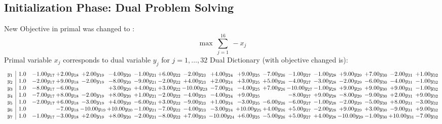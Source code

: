 \documentclass[9pt]{article}
\begin{document}
\subsection{Initialization Phase: Dual Problem Solving}
New Objective in primal was changed to : \[ \max\ \sum_{j=1}^{16}\ - x_j \] 
Primal variable $x_j$ corresponds to dual variable $y_j$ for $j = 1,\ldots,32$
Dual Dictionary (with objective changed is): 
\[\begin{array}{c| c c@{\hskip 2pt} c@{\hskip 2pt} c@{\hskip 2pt} c@{\hskip 2pt} c@{\hskip 2pt} c@{\hskip 2pt} c@{\hskip 2pt} c@{\hskip 2pt} c@{\hskip 2pt} c@{\hskip 2pt} c@{\hskip 2pt} c@{\hskip 2pt} c@{\hskip 2pt} c@{\hskip 2pt} c@{\hskip 2pt} c@{\hskip 2pt} }
 y_{1}   &  1.0 & -1.00 y_{17} & +  2.00 y_{18} & +  2.00 y_{19} & -4.00 y_{20} & -1.00 y_{21} & +  6.00 y_{22} & -2.00 y_{23} & +  4.00 y_{24} & +  9.00 y_{25} & -7.00 y_{26} & -1.00 y_{27} & -1.00 y_{28} & +  9.00 y_{29} & +  7.00 y_{30} & -2.00 y_{31} & +  1.00 y_{32}\\
 y_{2}   &  1.0 & -2.00 y_{17} & +  9.00 y_{18} & -2.00 y_{19} & -8.00 y_{20} & -9.00 y_{21} & -2.00 y_{22} & +  4.00 y_{23} & +  2.00 y_{24} & +  3.00 y_{25} & +  5.00 y_{26} & -4.00 y_{27} & -3.00 y_{28} & -2.00 y_{29} & -6.00 y_{30} & -4.00 y_{31} & -1.00 y_{32}\\
 y_{3}   &  1.0 & -8.00 y_{17} & -6.00 y_{18} &   & +  3.00 y_{20} & +  4.00 y_{21} & +  3.00 y_{22} & -10.00 y_{23} & -7.00 y_{24} & -4.00 y_{25} & +  7.00 y_{26} & -10.00 y_{27} & -1.00 y_{28} & +  9.00 y_{29} & +  9.00 y_{30} & +  9.00 y_{31} & -1.00 y_{32}\\
 y_{4}   &  1.0 & -7.00 y_{17} & +  8.00 y_{18} & -2.00 y_{19} & +  8.00 y_{20} & +  1.00 y_{21} & -2.00 y_{22} & -4.00 y_{23} & -4.00 y_{24} & +  9.00 y_{25} &   & -8.00 y_{27} & +  9.00 y_{28} & -8.00 y_{29} & -9.00 y_{30} & +  2.00 y_{31} & +  9.00 y_{32}\\
 y_{5}   &  1.0 & -2.00 y_{17} & +  6.00 y_{18} & -3.00 y_{19} & +  4.00 y_{20} & -6.00 y_{21} & +  3.00 y_{22} & -9.00 y_{23} & +  1.00 y_{24} & -3.00 y_{25} & -6.00 y_{26} & -6.00 y_{27} & -1.00 y_{28} & -2.00 y_{29} & -5.00 y_{30} & +  8.00 y_{31} & -3.00 y_{32}\\
 y_{6}   &  1.0  &   & -7.00 y_{18} & -10.00 y_{19} & + 10.00 y_{20} & -1.00 y_{21} & -7.00 y_{22} & -4.00 y_{23} & -3.00 y_{24} & + 10.00 y_{25} & +  4.00 y_{26} & +  5.00 y_{27} & -2.00 y_{28} & +  9.00 y_{29} & +  3.00 y_{30} & -9.00 y_{31} & +  9.00 y_{32}\\
 y_{7}   &  1.0 & -1.00 y_{17} & -3.00 y_{18} & +  2.00 y_{19} & +  8.00 y_{20} & -2.00 y_{21} & -8.00 y_{22} & +  7.00 y_{23} & -10.00 y_{24} & +  6.00 y_{25} & -5.00 y_{26} & +  5.00 y_{27} & +  4.00 y_{28} & -10.00 y_{29} & -1.00 y_{30} & + 10.00 y_{31} & -7.00 y_{32}\\

\end{array}\]
\end{document}
